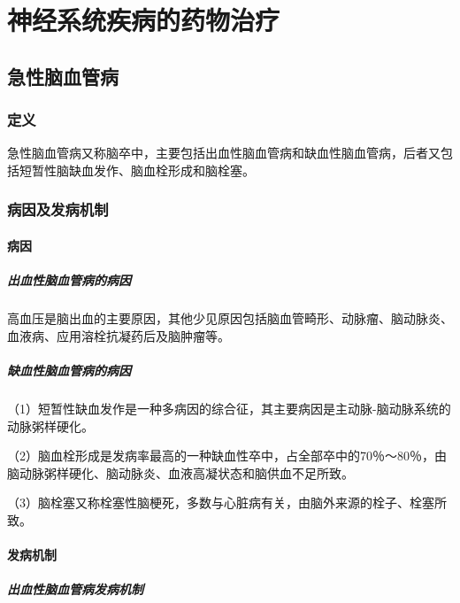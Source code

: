 \chapter{神经系统疾病的药物治疗}

\section{急性脑血管病}

\subsection{定义}

急性脑血管病又称脑卒中，主要包括出血性脑血管病和缺血性脑血管病，后者又包括短暂性脑缺血发作、脑血栓形成和脑栓塞。

\subsection{病因及发病机制}

\subsubsection{病因}
\paragraph{出血性脑血管病的病因}

高血压是脑出血的主要原因，其他少见原因包括脑血管畸形、动脉瘤、脑动脉炎、血液病、应用溶栓抗凝药后及脑肿瘤等。
\paragraph{缺血性脑血管病的病因}

（1）短暂性缺血发作是一种多病因的综合征，其主要病因是主动脉-脑动脉系统的动脉粥样硬化。

（2）脑血栓形成是发病率最高的一种缺血性卒中，占全部卒中的70％～80％，由脑动脉粥样硬化、脑动脉炎、血液高凝状态和脑供血不足所致。

（3）脑栓塞又称栓塞性脑梗死，多数与心脏病有关，由脑外来源的栓子、栓塞所致。

\subsubsection{发病机制}
\paragraph{出血性脑血管病发病机制}

